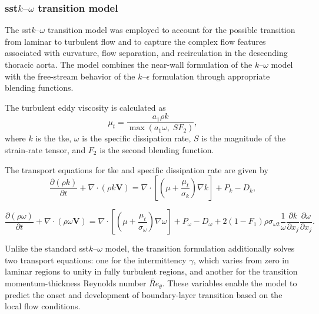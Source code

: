 \documentclass[12pt,a4paper]{article}
\newcommand{\TKE}{\ac{tke}\xspace}
\newcommand{\SST}{\ac{sst}\xspace}
\newcommand{\SSTcap}{\Ac{sst}\xspace}
\theoremstyle{definition}
\numberwithin{equation}{section}
\begin{document}
\subsubsection{\texorpdfstring{\SSTcap \(k\)--\(\omega\) transition model}{SST k-omega transition model}}

The \SST \(k\)--\(\omega\) transition model was employed to account for the possible transition from laminar to turbulent flow and to capture the complex flow features associated with curvature, flow separation, and recirculation in the descending thoracic aorta. The model combines the near-wall formulation of the \(k\)--\(\omega\) model with the free-stream behavior of the \(k\)--\(\epsilon\) formulation through appropriate blending functions.

The turbulent eddy viscosity is calculated as
\begin{equation}
    \mu_t =
    \frac{a_1 \rho k}{\max(a_1\omega,\;SF_2)},
    \label{eq:mutt}
\end{equation}
where \(k\) is the \TKE, \(\omega\) is the specific dissipation rate, \(S\) is the magnitude of the strain-rate tensor, and \(F_2\) is the second blending function.

The transport equations for \TKE and specific dissipation rate are given by
\begin{equation}
\frac{\partial(\rho k)}{\partial t}
+\nabla\cdot(\rho k\mathbf{V})
=
\nabla\cdot
\left[
\left(\mu+\frac{\mu_t}{\sigma_k}\right)\nabla k
\right]
+P_k-D_k,
\label{eq:keqn}
\end{equation}

\begin{equation}
\frac{\partial(\rho\omega)}{\partial t}
+\nabla\cdot(\rho\omega\mathbf{V})
=
\nabla\cdot
\left[
\left(\mu+\frac{\mu_t}{\sigma_\omega}\right)\nabla\omega
\right]
+P_\omega-D_\omega
+
2(1-F_1)\rho\sigma_{\omega2}
\frac{1}{\omega}
\frac{\partial k}{\partial x_j}
\frac{\partial\omega}{\partial x_j}.
\label{eq:omegaeqn}
\end{equation}

Unlike the standard \SST \(k\)--\(\omega\) model, the transition formulation additionally solves two transport equations: one for the intermittency \(\gamma\), which varies from zero in laminar regions to unity in fully turbulent regions, and another for the transition momentum-thickness Reynolds number \(\widetilde{Re}_\theta\). These variables enable the model to predict the onset and development of boundary-layer transition based on the local flow conditions.
\end{document}
